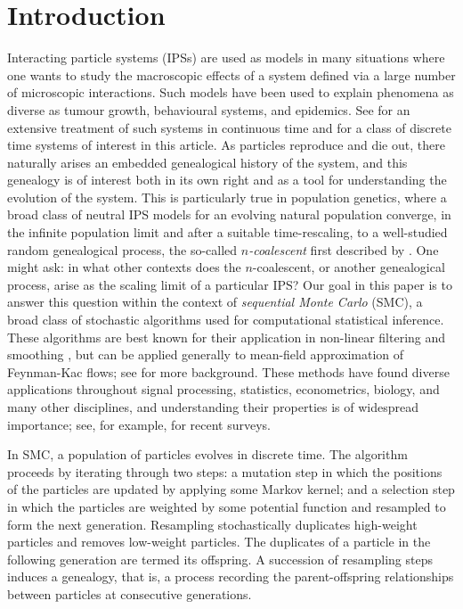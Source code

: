 \documentclass{article}
\theoremstyle{definition}
\newcommand{\1}[1]{\mathbbm{1}_{\{#1\}}}
\begin{document}
\section{Introduction}
Interacting particle systems (IPSs) are used as models in many situations where one wants to study the macroscopic effects of a system defined via a large number of microscopic interactions. Such models have been used to explain phenomena as diverse as tumour growth, behavioural systems, and epidemics. See \citet{lig:2005} for an extensive treatment of such systems in continuous time and \citet{delmoral2004} for a class of discrete time systems of interest in this article.
As particles reproduce and die out, there naturally arises an embedded genealogical history of the system, and this genealogy is of interest both in its own right and as a tool for understanding the evolution of the system. This is particularly true in population genetics, where a broad class of neutral IPS models for an evolving natural population converge, in the infinite population limit and after a suitable time-rescaling, to a well-studied random genealogical process, the so-called \emph{$n$-coalescent} first described by \citet{kingman1982coal}. One might ask: in what other contexts does the $n$-coalescent, or another genealogical process, arise as the scaling limit of a particular IPS? Our goal in this paper is to answer this question within the context of \emph{sequential Monte Carlo} (SMC), a broad class of stochastic algorithms used for computational statistical inference. These algorithms are best known for their application in non-linear filtering and smoothing \citep{gordon1993}, but can be applied generally to mean-field approximation of Feynman-Kac flows; see \citet{delmoral2004} for more background. These methods have found diverse applications throughout signal processing, statistics, econometrics, biology, and many other disciplines, and understanding their properties is of widespread importance; see, for example, \citet{doucet2009,fearnhead18,naesseth2019,chopin2020} for recent surveys.

In SMC, a population of particles evolves in discrete time. The algorithm proceeds by iterating through two steps: a mutation step in which the positions of the particles are updated by applying some Markov kernel; and a selection step in which the particles are weighted by some potential function and resampled to form the next generation. Resampling stochastically duplicates high-weight particles and removes low-weight particles. The duplicates of a particle in the following generation are termed its offspring. A succession of resampling steps induces a genealogy, that is, a process recording the parent-offspring relationships between particles at consecutive generations.
\end{document}
